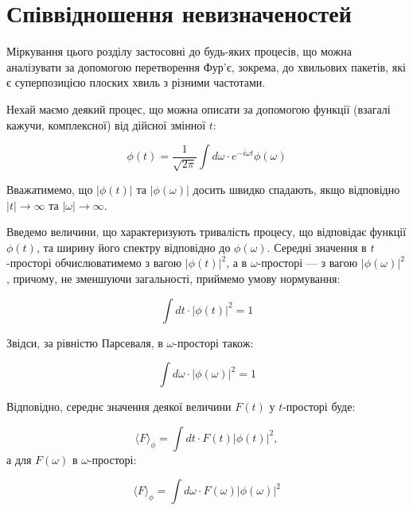 \section{Співвідношення невизначеностей}

Міркування цього розділу застосовні до будь-яких процесів, що можна аналізувати за допомогою перетворення Фур’є, зокрема, до хвильових пакетів, які є
суперпозицією плоских хвиль з різними частотами.

Нехай маємо деякий процес, що можна описати за допомогою функції (взагалі кажучи, комплексної) від дійсної змінної \( t \):

\begin{equation*}
\phi(t) = \frac{1}{\sqrt{2\pi}} \int d\omega \cdot e^{-i\omega t} \phi(\omega)
\end{equation*}

Вважатимемо, що \( |\phi(t)| \) та \( |\phi(\omega)| \) досить швидко спадають, якщо відповідно \( |t| \to \infty \) та \( |\omega| \to \infty \).

Введемо величини, що характеризують тривалість процесу, що відповідає функції \( \phi(t) \), та ширину його спектру відповідно до \( \phi(\omega) \).
Середні значення в \( t \)-просторі обчислюватимемо з вагою \( |\phi(t)|^2 \), а в \( \omega \)-просторі --- з вагою \( |\phi(\omega)|^2 \), причому, не
зменшуючи загальності, приймемо умову нормування:

\begin{equation*}
\int dt \cdot |\phi(t)|^2 = 1
\end{equation*}

Звідси, за рівністю Парсеваля, в \( \omega \)-просторі також:

\begin{equation*}
\int d\omega \cdot |\phi(\omega)|^2 = 1
\end{equation*}

Відповідно, середнє значення деякої величини \( F(t) \) у \( t \)-просторі буде:

\begin{equation*}
\langle F \rangle_{\phi} = \int dt \cdot F(t) |\phi(t)|^2,
\end{equation*}
а для \( F(\omega) \) в \( \omega \)-просторі:

\begin{equation*}
\langle F \rangle_{\phi} = \int d\omega \cdot F(\omega) |\phi(\omega)|^2
\end{equation*}

